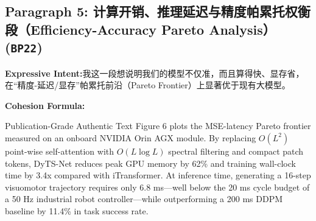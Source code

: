\subsection*{Paragraph 5: 计算开销、推理延迟与精度帕累托权衡段（Efficiency-Accuracy Pareto Analysis） (\texttt{BP22})}
\noindent\textbf{Expressive Intent:}\enspace 我这一段想说明我们的模型不仅准，而且算得快、显存省，在“精度-延迟/显存”帕累托前沿（Pareto Frontier）上显著优于现有大模型。\par
\noindent\textbf{Cohesion Formula:}\par\vspace{4pt}
\begin{ExampleBox}{Publication-Grade Authentic Text}
Figure 6 plots the MSE-latency Pareto frontier measured on an onboard NVIDIA Orin AGX module. By replacing $O(L^2)$ point-wise self-attention with $O(L \log L)$ spectral filtering and compact patch tokens, DyTS-Net reduces peak GPU memory by 62\% and training wall-clock time by 3.4x compared with iTransformer. At inference time, generating a 16-step visuomotor trajectory requires only 6.8 ms---well below the 20 ms cycle budget of a 50 Hz industrial robot controller---while outperforming a 200 ms DDPM baseline by 11.4\% in task success rate.
\end{ExampleBox}

